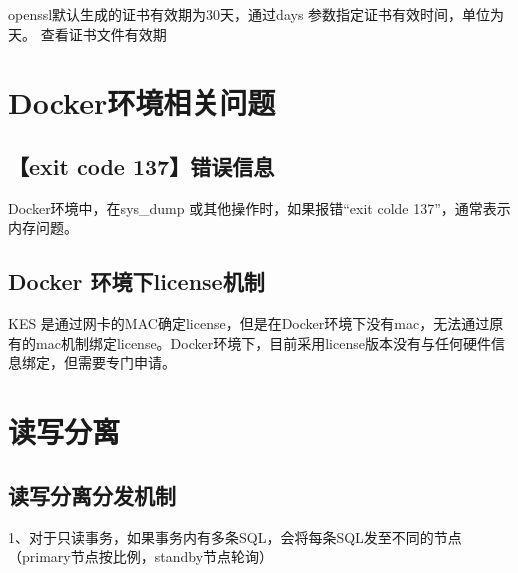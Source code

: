 \documentclass[letterpaper,10pt,english]{sphinxmanual}
\let\sphinxpxdimen\pdfpxdimen\else\newdimen\sphinxpxdimen
\begin{document}
openssl默认生成的证书有效期为30天，通过\sphinxhyphen{}days 参数指定证书有效时间，单位为天。
查看证书文件有效期

\begin{sphinxVerbatim}[commandchars=\\\{\}]
     
\end{sphinxVerbatim}


\chapter{Docker环境相关问题}
\label{\detokenize{docker:docker}}\label{\detokenize{docker::doc}}

\section{【exit code 137】错误信息}
\label{\detokenize{docker:exit-code-137}}
Docker环境中，在sys\_dump 或其他操作时，如果报错“exit colde 137”，通常表示内存问题。

\begin{figure}[htbp]
\centering

\noindent\sphinxincludegraphics[width=554\sphinxpxdimen,height=92\sphinxpxdimen]{{FAQ34211}.png}
\end{figure}


\section{Docker 环境下license机制}
\label{\detokenize{docker:docker-license}}
KES 是通过网卡的MAC确定license，但是在Docker环境下没有mac，无法通过原有的mac机制绑定license。Docker环境下，目前采用license版本没有与任何硬件信息绑定，但需要专门申请。


\chapter{读写分离}
\label{\detokenize{high-availability:id1}}\label{\detokenize{high-availability::doc}}

\section{读写分离分发机制}
\label{\detokenize{high-availability:id2}}
1、对于只读事务，如果事务内有多条SQL，会将每条SQL发至不同的节点（primary节点按比例，standby节点轮询）
\end{document}
